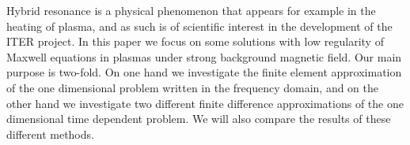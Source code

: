 Hybrid resonance is a physical phenomenon
that appears for example in the heating of plasma,
and as such is of scientific interest in the development  of  the ITER project.
In this paper we focus on some solutions with low regularity of Maxwell equations in
plasmas under strong background magnetic field.
Our main purpose is two-fold.
On one hand we investigate the finite element approximation of the one dimensional problem 
written in the frequency domain, and on the other hand we investigate two different 
finite difference approximations of the one dimensional time dependent problem.
We will also compare the results of these different methods.
